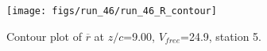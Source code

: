 \begin{figure}[H]
\centering
\texttt{[image: figs/run\_46/run\_46\_R\_contour]}
\caption{Contour plot of $\overline{r}$ at $z/c$=9.00, $V_{free}$=24.9, station 5.}
\label{fig:run_46_R_contour}
\end{figure}


